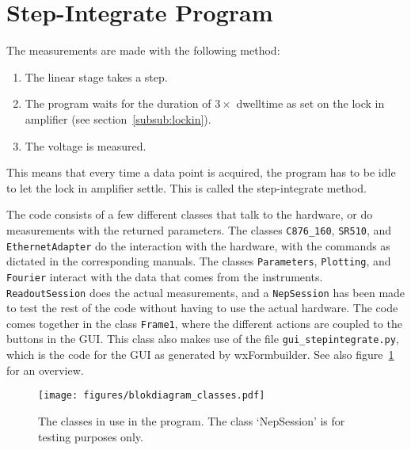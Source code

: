 
\section{Step-Integrate Program}


The measurements are made with the following method:

\begin{enumerate}
 \item The linear stage takes a step.
 \item The program waits for the duration of $3\times$ dwelltime as set on the lock in amplifier (see section~\ref{subsub:lockin}).
 \item The voltage is measured.
\end{enumerate}

This means that every time a data point is acquired, the program has to be idle to let the lock in amplifier settle. This is called the step-integrate method.

The code consists of a few different classes that talk to the hardware, or do measurements with the returned parameters. The classes \verb!C876_160!, \verb!SR510!, and \verb!EthernetAdapter! do the interaction with the hardware, with the commands as dictated in the corresponding manuals. The classes \verb!Parameters!, \verb!Plotting!, and \verb!Fourier! interact with the data that comes from the instruments. \verb!ReadoutSession! does the actual measurements, and a \verb!NepSession! has been made to test the rest of the code without having to use the actual hardware. The code comes together in the class \verb!Frame1!, where the different actions are coupled to the buttons in the GUI. This class also makes use of the file \verb!gui_stepintegrate.py!, which is the code for the GUI as generated by wxFormbuilder. See also figure~\ref{fig:blokdiagram} for an overview.


\begin{figure}[h!tb]
 \begin{center}
  \texttt{[image: figures/blokdiagram\_classes.pdf]}
  \caption{The classes in use in the program. The class `NepSession' is for testing purposes only.}
  \label{fig:blokdiagram}
 \end{center}
\end{figure}

